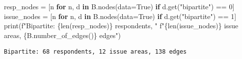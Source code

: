 \documentclass[
  letterpaper,
  DIV=11,
  numbers=noendperiod]{scrartcl}
\newenvironment{Shaded}{\begin{snugshade}}{\end{snugshade}}
\newcommand{\BuiltInTok}[1]{\textcolor[rgb]{0.00,0.23,0.31}{#1}}
\newcommand{\ControlFlowTok}[1]{\textcolor[rgb]{0.00,0.23,0.31}{\textbf{#1}}}
\newcommand{\DecValTok}[1]{\textcolor[rgb]{0.68,0.00,0.00}{#1}}
\newcommand{\KeywordTok}[1]{\textcolor[rgb]{0.00,0.23,0.31}{\textbf{#1}}}
\newcommand{\NormalTok}[1]{\textcolor[rgb]{0.00,0.23,0.31}{#1}}
\newcommand{\OperatorTok}[1]{\textcolor[rgb]{0.37,0.37,0.37}{#1}}
\newcommand{\SpecialCharTok}[1]{\textcolor[rgb]{0.37,0.37,0.37}{#1}}
\newcommand{\SpecialStringTok}[1]{\textcolor[rgb]{0.13,0.47,0.30}{#1}}
\newcommand{\StringTok}[1]{\textcolor[rgb]{0.13,0.47,0.30}{#1}}
\newcommand{\VariableTok}[1]{\textcolor[rgb]{0.07,0.07,0.07}{#1}}
\begin{document}
\begin{Shaded}
\begin{Highlighting}[]
\NormalTok{resp\_nodes }\OperatorTok{=}\NormalTok{ [n }\ControlFlowTok{for}\NormalTok{ n, d }\KeywordTok{in}\NormalTok{ B.nodes(data}\OperatorTok{=}\VariableTok{True}\NormalTok{) }\ControlFlowTok{if}\NormalTok{ d.get(}\StringTok{"bipartite"}\NormalTok{) }\OperatorTok{==} \DecValTok{0}\NormalTok{]}
\NormalTok{issue\_nodes }\OperatorTok{=}\NormalTok{ [n }\ControlFlowTok{for}\NormalTok{ n, d }\KeywordTok{in}\NormalTok{ B.nodes(data}\OperatorTok{=}\VariableTok{True}\NormalTok{) }\ControlFlowTok{if}\NormalTok{ d.get(}\StringTok{"bipartite"}\NormalTok{) }\OperatorTok{==} \DecValTok{1}\NormalTok{]}
\BuiltInTok{print}\NormalTok{(}\SpecialStringTok{f"Bipartite: }\SpecialCharTok{\{}\BuiltInTok{len}\NormalTok{(resp\_nodes)}\SpecialCharTok{\}}\SpecialStringTok{ respondents, "}
      \SpecialStringTok{f"}\SpecialCharTok{\{}\BuiltInTok{len}\NormalTok{(issue\_nodes)}\SpecialCharTok{\}}\SpecialStringTok{ issue areas, }\SpecialCharTok{\{}\NormalTok{B}\SpecialCharTok{.}\NormalTok{number\_of\_edges()}\SpecialCharTok{\}}\SpecialStringTok{ edges"}\NormalTok{)}
\end{Highlighting}
\end{Shaded}

\begin{verbatim}
Bipartite: 68 respondents, 12 issue areas, 138 edges
\end{verbatim}
\end{document}
